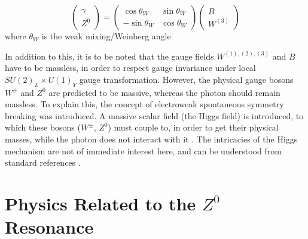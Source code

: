 \begin{equation}
\begin{pmatrix} 
\gamma \\ 
Z^{0} 
\end{pmatrix}
= 
\begin{pmatrix}
\cos \theta_{W} & \sin \theta_{W} \\
-\sin \theta_{W} & \cos \theta_{W} 
\end{pmatrix}
\begin{pmatrix}
B \\
W^{(3)}
\end{pmatrix}
\end{equation}
where $\theta_{W}$ is the weak mixing/Weinberg angle

In addition to this, it is to be noted that the gauge fields $W^{(1),(2),(3)}$ and $B$ have to be massless, in order to respect gauge invariance under local $SU(2)_{L}\times U(1)_{Y}$ gauge transformation. However, the physical gauge bosons $W^{\pm}$ and $Z^{0}$ are predicted to be massive, whereas the photon should remain massless. To explain this, the concept of electroweak spontaneous symmetry breaking was introduced. A massive scalar field (the Higgs field) is introduced, to which these bosons ($W^{\pm}$, $Z^{0}$) must couple to, in order to get their physical masses, while the photon does not interact with it \cite{Dooling:207610}. The intricacies of the Higgs mechanism are not of immediate interest here, and can be understood from standard references \cite{thomson_2013, Griffiths:111880}.

\section{Physics Related to the $Z^{0}$ Resonance}
